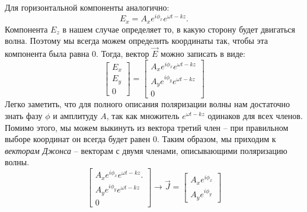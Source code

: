 Для горизонтальной компоненты аналогично:
\[
E_x = A_x e^{i\phi_x}e^{\omega t - kz}.
\]
Компонента $E_z$ в нашем случае определяет то, в какую сторону будет двигаться волна. Поэтому мы всегда можем определить координаты так, чтобы эта компонента была равна 0. Тогда, вектор $\Vec{E}$ можно записать в виде:
\[
\begin{bmatrix} E_x\\ E_y\\ 0 \end{bmatrix} = \begin{bmatrix} A_x e^{i\phi_x}e^{\omega t - kz}\\ A_y e^{i\phi_y}e^{\omega t - kz}\\ 0 \end{bmatrix}
\]
Легко заметить, что для полного описания поляризации волны нам достаточно знать фазу $\phi$ и амплитуду $A$, так как множитель $e^{\omega t - kz}$ одинаков для всех членов. Помимо этого, мы можем выкинуть из вектора третий член -- при правильном выборе координат он всегда будет равен 0. Таким образом, мы приходим к \textit{векторам Джонса} -- векторам с двумя членами, описывающими поляризацию волны.
\[
\begin{bmatrix} A_x e^{i\phi_x}e^{\omega t - kz}.\\ A_y e^{i\phi_y}e^{\omega t - kz}\\ 0 \end{bmatrix} \rightarrow \Vec{J} = \begin{bmatrix} A_x e^{i\phi_x}\\ A_y e^{i\phi_y}\end{bmatrix}
\]

